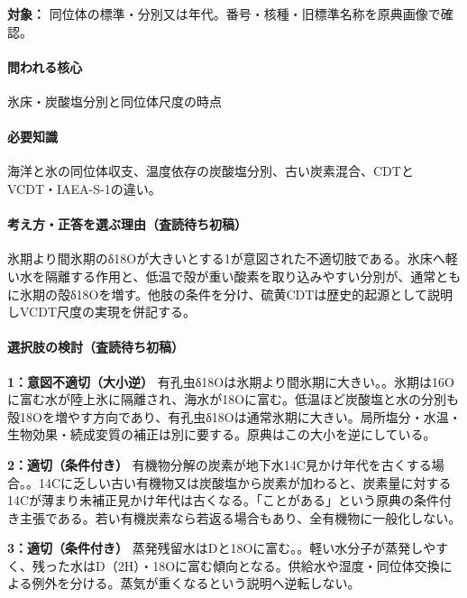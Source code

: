 \noindent\textbf{対象：} 同位体の標準・分別又は年代。番号・核種・旧標準名称を原典画像で確認。\par

\paragraph{問われる核心} 氷床・炭酸塩分別と同位体尺度の時点

\paragraph{必要知識} 海洋と氷の同位体収支、温度依存の炭酸塩分別、古い炭素混合、CDTとVCDT・IAEA-S-1の違い。

\paragraph{考え方・正答を選ぶ理由（査読待ち初稿）} 氷期より間氷期のδ18Oが大きいとする1が意図された不適切肢である。氷床へ軽い水を隔離する作用と、低温で殻が重い酸素を取り込みやすい分別が、通常ともに氷期の殻δ18Oを増す。他肢の条件を分け、硫黄CDTは歴史的起源として説明しVCDT尺度の実現を併記する。

\paragraph{選択肢の検討（査読待ち初稿）}\mbox{}\par

\noindent\textbf{1：意図不適切（大小逆）} 有孔虫δ18Oは氷期より間氷期に大きい。。氷期は16Oに富む水が陸上氷に隔離され、海水が18Oに富む。低温ほど炭酸塩と水の分別も殻18Oを増やす方向であり、有孔虫δ18Oは通常氷期に大きい。局所塩分・水温・生物効果・続成変質の補正は別に要する。原典はこの大小を逆にしている。\par

\noindent\textbf{2：適切（条件付き）} 有機物分解の炭素が地下水14C見かけ年代を古くする場合。。14Cに乏しい古い有機物又は炭酸塩から炭素が加わると、炭素量に対する14Cが薄まり未補正見かけ年代は古くなる。「ことがある」という原典の条件付き主張である。若い有機炭素なら若返る場合もあり、全有機物に一般化しない。\par

\noindent\textbf{3：適切（条件付き）} 蒸発残留水はDと18Oに富む。。軽い水分子が蒸発しやすく、残った水はD（2H）・18Oに富む傾向となる。供給水や湿度・同位体交換による例外を分ける。蒸気が重くなるという説明へ逆転しない。\par


